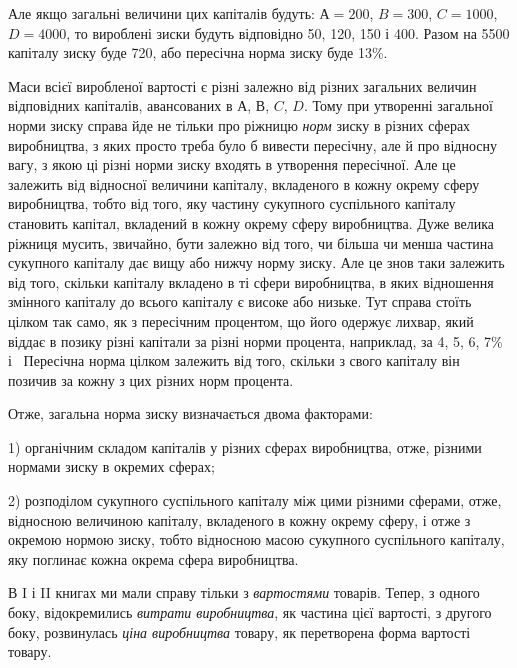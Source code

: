 Але якщо загальні величини цих капіталів будуть: $А = 200$, $B = 300$, $C = 1000$, $D = 4000$, то вироблені
зиски будуть відповідно 50, 120, 150 і 400. Разом на 5500 капіталу зиску буде 720, або пересічна
норма зиску буде 13\%.

Маси всієї виробленої вартості є різні залежно від різних загальних величин відповідних капіталів,
авансованих в $А$, $В$, $C$, $D$.
Тому при утворенні загальної норми зиску справа йде не тільки
про ріжницю \emph{норм} зиску в різних сферах виробництва, з яких
просто треба було б вивести пересічну, але й про відносну вагу,
з якою ці різні норми зиску входять в утворення пересічної.
Але це залежить від відносної величини капіталу, вкладеного
в кожну окрему сферу виробництва, тобто від того, яку частину
сукупного суспільного капіталу становить капітал, вкладений
в кожну окрему сферу виробництва. Дуже велика ріжниця мусить, звичайно, бути залежно від того, чи
більша чи менша
частина сукупного капіталу дає вищу або нижчу норму зиску.
Але це знов таки залежить від того, скільки капіталу вкладено
в ті сфери виробництва, в яких відношення змінного капіталу
до всього капіталу є високе або низьке. Тут справа стоїть цілком
так само, як з пересічним процентом, що його одержує лихвар,
який віддає в позику різні капітали за різні норми процента, наприклад, за 4, 5, 6, 7\% і~
Пересічна норма цілком залежить
від того, скільки з свого капіталу він позичив за кожну з цих
різних норм процента.

Отже, загальна норма зиску визначається двома факторами:

1) органічним складом капіталів у різних сферах виробництва,
отже, різними нормами зиску в окремих сферах;

2) розподілом сукупного суспільного капіталу між цими різними сферами, отже, відносною величиною
капіталу, вкладеного
в кожну окрему сферу, і отже з окремою нормою зиску, тобто
відносною масою сукупного суспільного капіталу, яку поглинає
кожна окрема сфера виробництва.

В I і II книгах ми мали справу тільки з \emph{вартостями} товарів.
Тепер, з одного боку, відокремились \emph{витрати виробництва}, як
частина цієї вартості, з другого боку, розвинулась \emph{ціна виробництва} товару, як перетворена форма
вартості товару.

